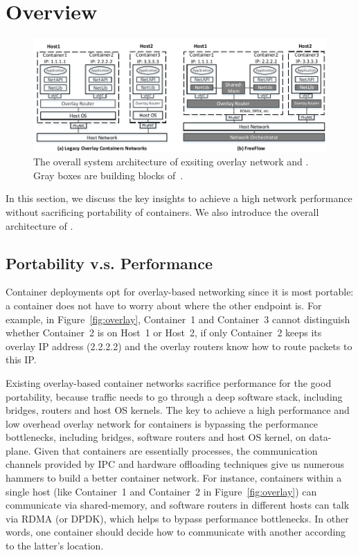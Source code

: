 \section{Overview} \label{sec:overview}

\begin{figure}[t!] 
     \centering 
     \includegraphics[width=7in]{figures/system-arch.pdf} 
    \caption{\label{fig:sysarch} The overall system architecture of exsiting overlay network and \sysname. Gray boxes are building blocks of~\sysname.} 
\end{figure} 

In this section, we discuss the key insights to achieve a high network
performance without sacrificing portability of containers. We also 
introduce the overall architecture of \sysname. 


\subsection{Portability v.s. Performance}
Container deployments opt for overlay-based networking since it is most
portable: a container does not have to worry about where the other endpoint is.
For example, in Figure~\ref{fig:overlay}, Container~1 and Container~3 cannot
distinguish whether Container~2 is on Host~1 or Host~2, if only Container~2
keeps its overlay IP address (2.2.2.2) and the overlay routers know how to
route packets to this IP. 

Existing overlay-based container networks sacrifice performance for 
the good portability, because traffic needs to go through a deep software 
stack, including bridges, routers and host OS kernels. 
The key to achieve a high performance and low overhead overlay network for
containers is bypassing the performance bottlenecks, including bridges, software
routers and host OS kernel, on data-plane. Given that containers are essentially
processes, the communication channels provided by IPC and hardware offloading
techniques give us numerous hammers to build a better container network. For
instance, containers within a single host (like Container~1 and Container~2 in
Figure~\ref{fig:overlay}) can communicate via shared-memory, and software routers
in different hosts can talk via RDMA (or DPDK), which helps to bypass performance
bottlenecks. In other words, one container should decide how to communicate
with another according to the latter's location. 

